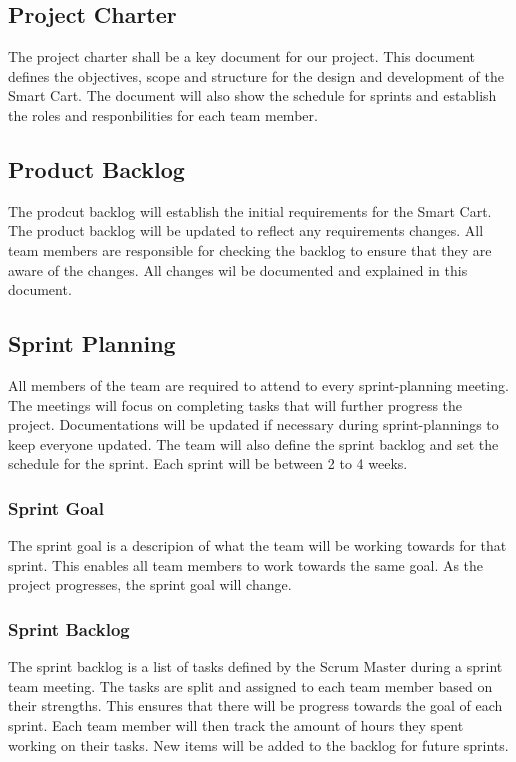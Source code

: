 \subsection{Project Charter}
The project charter shall be a key document for our project. This document defines the objectives, scope and structure for the design and development of the Smart Cart. The document will also show the schedule for sprints and establish the roles and responbilities for each team member. 

\subsection{Product Backlog}
The prodcut backlog will establish the initial requirements for the Smart Cart. The product backlog will be updated to reflect any requirements changes. All team members are responsible for checking the backlog to ensure that they are aware of the changes. All changes wil be documented and explained in this document.

\subsection{Sprint Planning}
All members of the team are required to attend to every sprint-planning meeting. The meetings will focus on completing tasks that will further progress the project. Documentations will be updated if necessary during sprint-plannings to keep everyone updated. The team will also define the sprint backlog and set the schedule for the sprint. Each sprint will be between 2 to 4 weeks.

\subsubsection{Sprint Goal}
The sprint goal is a descripion of what the team will be working towards for that sprint. This enables all team members to work towards the same goal. As the project progresses, the sprint goal will change.

\subsubsection{Sprint Backlog}
The sprint backlog is a list of tasks defined by the Scrum Master during a sprint team meeting. The tasks are split and assigned to each team member based on their strengths. This ensures that there will be progress towards the goal of each sprint. Each team member will then track the amount of hours they spent working on their tasks. New items will be added to the backlog for future sprints.

